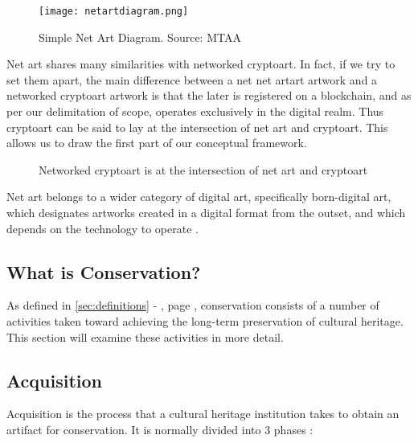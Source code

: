 \begin{figure}[h]
    \centering
    \texttt{[image: netartdiagram.png]}
    \caption[Simple Net Art Diagram]{Simple Net Art Diagram. Source: MTAA \cite{NETARTANTHOLOGY2016a}}
    \label{fig:simplenetartdiag}
\end{figure}

Net art shares many similarities with networked cryptoart. In fact, if we try to set them apart, the main difference between a net net artart artwork and a networked cryptoart artwork is that the later is registered on a blockchain, and as per our delimitation of scope, operates exclusively in the digital realm. Thus cryptoart can be said to lay at the intersection of net art and cryptoart. This allows us to draw the first part of our conceptual framework.


\begin{figure}[h]
    \centering
    
    \caption[Networked cryptoart at the intersection of net art and cryptoart]{Networked cryptoart is at the intersection of net art and cryptoart}
    \label{fig:netart-cryptoart}
\end{figure}

Net art belongs to a wider category of digital art, specifically born-digital art, which designates artworks created in a digital format from the outset, and which depends on the technology to operate \cite{innocentiKeepingBitsAlive2013}.

\subsection{What is Conservation?}

As defined in \autoref{sec:definitions} -  , page \pageref{sec:definitions}, conservation consists of a number of activities taken toward achieving the long-term preservation of cultural heritage. This section will examine these activities in more detail.

\subsection{Acquisition}

Acquisition is the process that a cultural heritage institution takes to obtain an artifact for conservation. It is normally divided into 3 phases \cite{ahtilaAcquiringMediaArt1998}:

